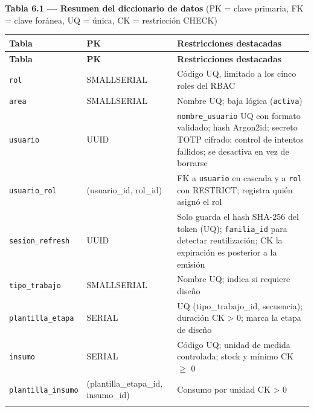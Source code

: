 \documentclass[11pt,a4paper]{article}
\begin{document}
\textbf{Tabla 6.1 --- Resumen del diccionario de datos} (PK = clave primaria, FK = clave foránea, UQ = única, CK = restricción CHECK)\nopagebreak

\begingroup
\begin{longtable}{@{}>{\raggedright\arraybackslash\hspace{0pt}}p{}>{\raggedright\arraybackslash\hspace{0pt}}p{}>{\raggedright\arraybackslash\hspace{0pt}}p{}@{}}
\toprule
\textbf{Tabla} & \textbf{PK} & \textbf{Restricciones destacadas} \\ \midrule
\endfirsthead
\toprule
\textbf{Tabla} & \textbf{PK} & \textbf{Restricciones destacadas} \\ \midrule
\endhead
\bottomrule
\endlastfoot
\texttt{rol} & \mbox{SMALLSERIAL} & Código UQ, limitado a los cinco roles del RBAC \\ \addlinespace[0.25em]
\texttt{area} & \mbox{SMALLSERIAL} & Nombre UQ; baja lógica (\texttt{activa}) \\ \addlinespace[0.25em]
\texttt{usuario} & \mbox{UUID} & \texttt{nombre\_\allowbreak{}usuario} UQ con formato validado; hash Argon2id; secreto TOTP cifrado; control de intentos fallidos; se desactiva en vez de borrarse \\ \addlinespace[0.25em]
\texttt{usuario\_\allowbreak{}rol} & (usuario\_id, rol\_id) & FK a \texttt{usuario} en cascada y a \texttt{rol} con RESTRICT; registra quién asignó el rol \\ \addlinespace[0.25em]
\texttt{sesion\_\allowbreak{}refresh} & \mbox{UUID} & Solo guarda el hash SHA-256 del token (UQ); \texttt{familia\_\allowbreak{}id} para detectar reutilización; CK la expiración es posterior a la emisión \\ \addlinespace[0.25em]
\texttt{tipo\_\allowbreak{}trabajo} & \mbox{SMALLSERIAL} & Nombre UQ; indica si requiere diseño \\ \addlinespace[0.25em]
\texttt{plantilla\_\allowbreak{}etapa} & \mbox{SERIAL} & UQ (tipo\_trabajo\_id, secuencia); duración CK > 0; marca la etapa de diseño \\ \addlinespace[0.25em]
\texttt{insumo} & \mbox{SERIAL} & Código UQ; unidad de medida controlada; stock y mínimo CK \ensuremath{\geq} 0 \\ \addlinespace[0.25em]
\texttt{plantilla\_\allowbreak{}insumo} & (plantilla\_etapa\_id, insumo\_id) & Consumo por unidad CK > 0 \\ \addlinespace[0.25em]

\end{longtable}
\end{document}
